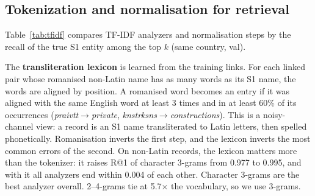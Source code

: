 \subsection{Tokenization and normalisation for retrieval}

Table~\ref{tab:tfidf} compares TF-IDF analyzers and normalisation steps by the recall of the true S1 entity
among the top $k$ (same country, val).

\begin{table}[h]
\centering\small
{}
\caption{TF-IDF retrieval on val. ``Non-Latin'': S2/S3 records whose text is not in Latin script.}
\label{tab:tfidf}
\end{table}

The \textbf{transliteration lexicon} is learned from the training links. For each linked pair whose
romanised non-Latin name has as many words as its S1 name, the words are aligned by position. A romanised
word becomes an entry if it was aligned with the same English word at least 3 times and in at least 60\% of
its occurrences (\emph{praivtt}$\to$\emph{private}, \emph{knstrksns}$\to$\emph{constructions}). This is a
noisy-channel view: a record is an S1 name transliterated to Latin letters,
then spelled phonetically. Romanisation inverts the first step, and the lexicon inverts the most common
errors of the second. On non-Latin records, the lexicon matters more than the tokenizer: it raises R@1 of
character 3-grams from 0.977 to 0.995, and with it all analyzers end within 0.004 of each other. Character
3-grams are the best analyzer overall. 2--4-grams tie at 5.7$\times$ the vocabulary, so we use 3-grams.

